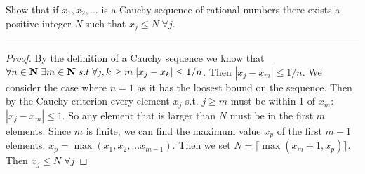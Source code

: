 \documentclass[11pt]{article}
\begin{document}
\newpage
{}
Show that if $x_1, x_2, ...$ is a Cauchy sequence of rational numbers there exists a positive integer $N$ such that $x_j \leq N \; \forall j$.
\hrule

\begin{proof}


By the definition of a Cauchy sequence we know that $\forall n \in \mathbf{N} \; \exists m \in \mathbf{N} \; s.t \; \forall j,k \geq m \; |x_j - x_k| \leq 1/n$. Then $|x_j - x_m| \leq 1/n$. We consider the case where $n = 1$ as it has the loosest bound on the sequence. Then by the Cauchy criterion every element $x_j$ s.t. $j \geq m$ must be within 1 of $x_m$: $|x_j - x_m| \leq 1$. So any element that is larger than $N$ must be in the first $m$ elements. Since $m$ is finite, we can find the maximum value $x_p$ of the first $m-1$ elements; $x_p = \max(x_1, x_2, ... x_{m-1}) $. Then we set $N = \lceil \max(x_m+1, x_p) \rceil $. Then $x_j \leq N \; \forall j$ 

\end{proof}
\end{document}
